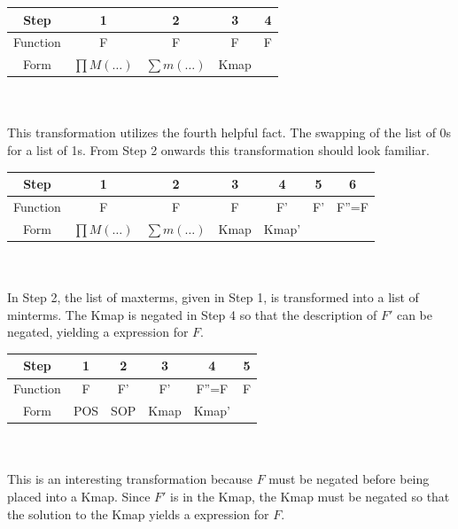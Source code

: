 \begin{process:minimizationKmap}
\begin{tabular}{|c|c|c|c|c|}\hline
Step	  & 1  & 2  & 3  & 4     \\ \hline
Function  & F  & F  & F  & F  \\ \hline
Form	  & $\prod M(\ldots)$ & $\sum m(\ldots)$ & Kmap & \SOPmin \\ \hline
\end{tabular}
\\ \\
This transformation utilizes the fourth helpful fact.  The swapping of the
list of 0s for a list of 1s.  From Step 2 onwards this transformation 
should look familiar.

\begin{tabular}{|c|c|c|c|c|c|c|}\hline
Step	  & 1  & 2  & 3  & 4  & 5  & 6\\ \hline
Function  & F  & F  & F  & F' & F' & F''=F \\ \hline
Form	  & $\prod M(\ldots)$ & $\sum m(\ldots)$ & Kmap & Kmap' & \SOPmin & \POSmin \\ \hline
\end{tabular}
\\ \\
In Step 2, the list of maxterms, given in Step 1, is transformed into a list
of minterms.  The Kmap is negated in Step 4 so that the \SOPmin description
of $F'$ can be negated, yielding a \POSmin expression for $F$.

\begin{tabular}{|c|c|c|c|c|c|}\hline
Step	  & 1  & 2  & 3  & 4  & 5  \\ \hline
Function  & F  & F'  & F'  & F''=F &  F \\ \hline
Form	  & POS & SOP & Kmap & Kmap' & \SOPmin \\ \hline
\end{tabular}
\\ \\
This is an interesting transformation because $F$ must be negated
before being placed into a Kmap.  Since $F'$ is in the Kmap, the
Kmap must be negated so that the solution to the Kmap
yields a \SOPmin expression for $F$.


\end{process:minimizationKmap}
